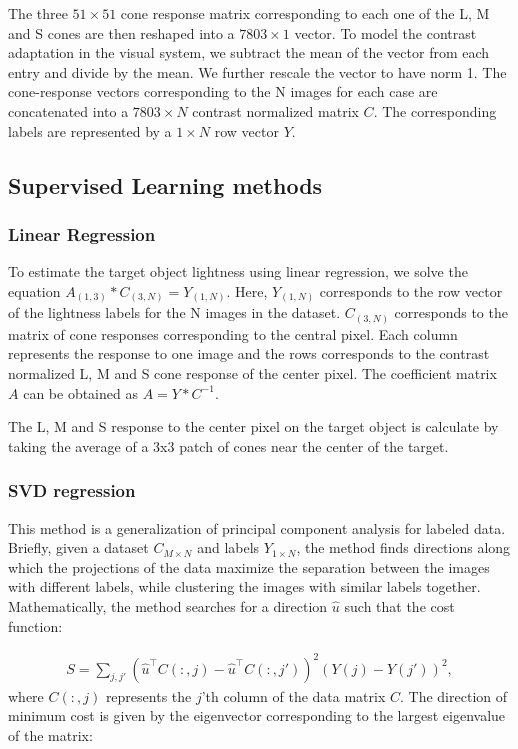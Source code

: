 \documentclass{jov}
\begin{document}
The three $51 \times 51$ cone response matrix corresponding to each one of the L, M and S cones are then reshaped into a $7803 \times 1$ vector. To model the contrast adaptation in the visual system, we subtract the mean of the vector from each entry and divide by the mean. We further rescale the vector to have norm 1. The cone-response vectors corresponding to the N images for each case are concatenated into a $7803 \times N$ contrast normalized matrix $C$. The corresponding labels are represented by a $1 \times N$ row vector $Y$.

\subsection{Supervised Learning methods} \label{method:SupervisedLearning}
\subsubsection*{Linear Regression} To estimate the target object lightness using linear regression, we solve the equation $A_{(1,3)}*C_{(3,N)} = Y_{(1,N)}$. Here, $Y_{(1,N)}$ corresponds to the row vector of the lightness labels for the N images in the dataset. $C_{(3,N)}$ corresponds to the matrix of cone responses corresponding to the central pixel. Each column represents the response to one image and the rows corresponds to the contrast normalized L, M and S cone response of the center pixel. The coefficient matrix $A$ can be obtained as $A = Y*C^{-1}$. 

The L, M and S response to the center pixel on the target object is calculate by taking the average of a 3x3 patch of cones near the center of the target.

\subsubsection*{SVD regression}
This method is a generalization of principal component analysis for labeled data. Briefly, given a dataset $C_{M \times N}$ and labels $Y_{1\times N}$, the method finds directions along which the projections of the data maximize the separation between the images with different labels, while clustering the images with similar labels together. Mathematically, the method searches for a direction $\hat{u}$ such that the cost function:

\begin{align}
S = \sum\limits_{j,j'}\left(\hat{u}^\intercal C(:,j) - \hat{u}^\intercal C(:,j')\right)^2 \left(Y(j)-Y(j') \right)^2,
\end{align} 
where $C(:,j)$ represents the $j$'th column of the data matrix $C$. The direction of minimum cost is given by the eigenvector corresponding to the largest eigenvalue of the matrix:
\end{document}
